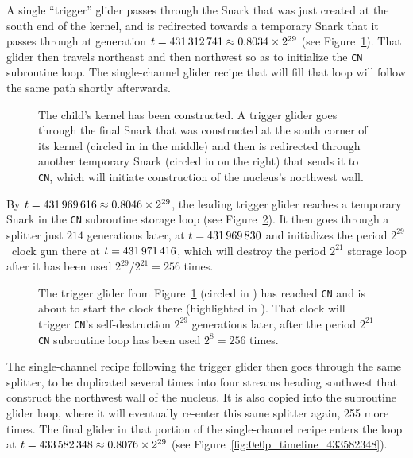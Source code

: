 A single ``trigger'' glider passes through the Snark that was just created at the south end of the kernel, and is redirected towards a temporary Snark that it passes through at generation $t = 431{\,}312{\,}741 \approx 0.8034 \times 2^{29}$ (see Figure~\ref{fig:0e0p_timeline_431312741}). That glider then travels northeast and then northwest so as to initialize the \texttt{CN} subroutine loop. The single-channel glider recipe that will fill that loop will follow the same path shortly afterwards.

\begin{figure}[!htb]
	\centering
	\caption{The child's kernel has been constructed. A trigger glider goes through the final Snark that was constructed at the south corner of its kernel (circled in  in the middle) and then is redirected through another temporary Snark (circled in  on the right) that sends it to \texttt{CN}, which will initiate construction of the nucleus's northwest wall.}
	\label{fig:0e0p_timeline_431312741}
\end{figure}

By $t = 431{\,}969{\,}616 \approx 0.8046 \times 2^{29}$, the leading trigger glider reaches a temporary Snark in the \texttt{CN} subroutine storage loop (see Figure~\ref{fig:0e0p_timeline_431969616}). It then goes through a splitter just $214$ generations later, at $t = 431{\,}969{\,}830$ and initializes the period $2^{29}$~clock gun there at $t = 431{\,}971{\,}416$, which will destroy the period $2^{21}$ storage loop after it has been used $2^{29}/2^{21} = 256$ times.

\begin{figure}[!htb]
	\centering
	\caption{The trigger glider from Figure~\ref{fig:0e0p_timeline_431312741} (circled in ) has reached \texttt{CN} and is about to start the clock there (highlighted in ). That clock will trigger \texttt{CN}'s self-destruction $2^{29}$ generations later, after the period $2^{21}$ \texttt{CN} subroutine loop has been used $2^8 = 256$ times.}
	\label{fig:0e0p_timeline_431969616}
\end{figure}

The single-channel recipe following the trigger glider then goes through the same splitter, to be duplicated several times into four streams heading southwest that construct the northwest wall of the nucleus. It is also copied into the subroutine glider loop, where it will eventually re-enter this same splitter again, 255 more times. The final glider in that portion of the single-channel recipe enters the loop at $t = 433{\,}582{\,}348 \approx 0.8076 \times 2^{29}$ (see Figure~\ref{fig:0e0p_timeline_433582348}).

